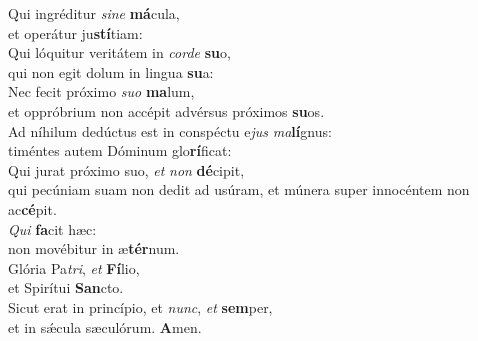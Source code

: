 \evenverse Qui ingréditur \textit{si}\textit{ne} \textbf{má}cula,~\*\\
\evenverse et operátur ju\textbf{stí}tiam:\\
\oddverse Qui lóquitur veritátem in \textit{cor}\textit{de} \textbf{su}o,~\*\\
\oddverse qui non egit dolum in lingua \textbf{su}a:\\
\evenverse Nec fecit próximo \textit{su}\textit{o} \textbf{ma}lum,~\*\\
\evenverse et oppróbrium non accépit advérsus próximos \textbf{su}os.\\
\oddverse Ad níhilum dedúctus est in conspéctu e\textit{jus} \textit{ma}\textbf{lí}gnus:~\*\\
\oddverse timéntes autem Dóminum glo\textbf{rí}ficat:\\
\evenverse Qui jurat próximo suo, \textit{et} \textit{non} \textbf{dé}cipit,~\*\\
\evenverse qui pecúniam suam non dedit ad usúram, et múnera super innocéntem non ac\textbf{cé}pit.\\
\oddverse \textit{Qui} \textbf{fa}cit hæc:~\*\\
\oddverse non movébitur in æ\textbf{tér}num.\\
\evenverse Glória Pa\textit{tri}, \textit{et} \textbf{Fí}lio,~\*\\
\evenverse et Spirítui \textbf{San}cto.\\
\oddverse Sicut erat in princípio, et \textit{nunc}, \textit{et} \textbf{sem}per,~\*\\
\oddverse et in sǽcula sæculórum. \textbf{A}men.\\
